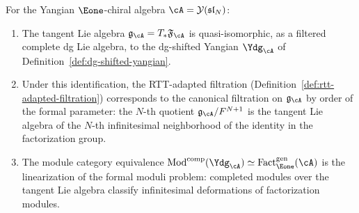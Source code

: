 \begin{conjecture}
\label{conj:dk4-formal-moduli}
For the Yangian $\Eone$-chiral algebra
$\cA = \mathcal{Y}(\mathfrak{sl}_N)$:
\begin{enumerate}[label=\textup{(\alph*)}]
\item The tangent Lie algebra
 $\mathfrak{g}_{\cA} = T_{*}\mathfrak{F}_{\cA}$
 is quasi-isomorphic, as a filtered complete dg Lie algebra, to the
 dg-shifted Yangian $\Ydg_{\cA}$ of
 Definition~\textup{\ref{def:dg-shifted-yangian}}.
\item Under this identification, the RTT-adapted filtration
 \textup{(}Definition~\textup{\ref{def:rtt-adapted-filtration}}\textup{)}
 corresponds to the canonical filtration on
 $\mathfrak{g}_{\cA}$ by order of the formal parameter: the $N$-th
 quotient $\mathfrak{g}_{\cA}/F^{N+1}$ is the tangent Lie algebra
 of the $N$-th infinitesimal neighborhood of the identity in the
 factorization group.
\item The module category equivalence
 $\operatorname{Mod}^{\mathrm{comp}}(\Ydg_{\cA}) \simeq
 \operatorname{Fact}_{\Eone}^{\mathrm{gen}}(\cA)$
 is the linearization of the formal moduli problem:
 completed modules over the tangent Lie algebra classify
 infinitesimal deformations of factorization modules.
\end{enumerate}
\end{conjecture}

